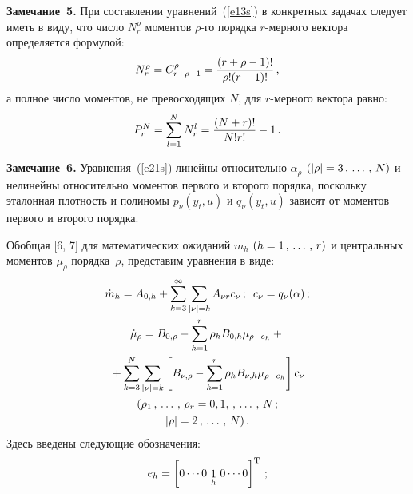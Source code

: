 \begin{multicols}{2}
\noindent
\textbf{Замечание~5.} При составлении уравнений~(\ref{e13s}) 
в конкретных задачах следует иметь в виду, что число $N_r^\rho$ 
моментов $\rho$-го порядка $r$-мер\-но\-го вектора определяется формулой:
    $$
    N_r^\rho = C_{r+\rho-1}^\rho = \displaystyle\frac{\displaystyle (r+\rho-1)!\mathstrut}{\displaystyle \rho! (r-1)!\mathstrut}\,,
    $$
а полное число моментов, не превосходящих $N$, для $r$-мер\-но\-го
вектора равно:
    $$
    P_r^N =\sum\limits_{l=1}^N N_r^l = \displaystyle\frac{\displaystyle (N+r)!\mathstrut}{\displaystyle N! r!\mathstrut}-1\,.$$
    
    \medskip

\noindent
\textbf{Замечание~6.} Уравнения~(\ref{e21s}) линейны относительно  
$\alpha_\rho$ $(\left\vert \rho\right\vert = 3\,,\,\ldots\,,\, N)$ и 
нелинейны относительно моментов первого и второго порядка, поскольку эталонная плот\-ность 
и полиномы  $p_\nu (y_t,u)$ и $q_\nu (y_t,u)$ зависят от моментов первого и второго порядка.

\smallskip

Обобщая [6, 7] для математических ожиданий $m_h$ $(h\hm=1\tr r)$ и центральных 
моментов $\mu_\rho$ порядка~$\rho$, представим уравнения в виде:
\begin{gather}
\dot m_h = A_{0, h} +\sum\limits_{k=3}^\infty \sum\limits_{|\nu |=k} A_{\nu r} c_\nu\,;\enskip 
c_\nu = q_\nu (\alpha)\,;\label{e23s}\\
\dot\mu_\rho = B_{0,\rho} - \sum\limits_{h=1}^r \rho_h B_{0,h} \mu_{\rho- e_h} + {}\notag\\
{}+
\sum\limits_{k=3}^N \sum\limits_{|\nu |=k} \left[ B_{\nu,\rho} - 
\sum\limits_{h=1}^r \rho_h B_{\nu,h} \mu_{\rho - e_h}\right] c_\nu\notag \\
(\rho_1\,,\,\ldots\,,\, \rho_r = 0,1,\,,\,\ldots\,,\, N\,; \notag\\ 
\left\vert \rho\right\vert = 2\,,\,\ldots\,,\, N)\,.\label{e24s}
\end{gather}
Здесь введены следующие обозначения:
\begin{equation*}
e_h = \left[ 0\cdots 0 \ {\mathop{1}\limits_h}\  0\cdots 0\right]^{\mathrm{T}}\,;
\end{equation*}


\end{multicols}
